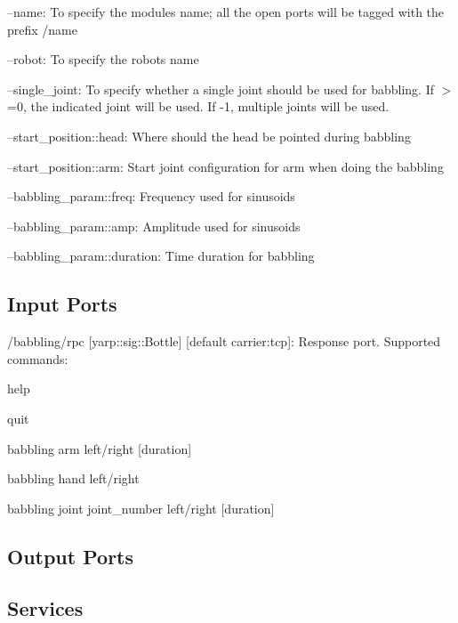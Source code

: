 \begin{DoxyItemize}
\item --name\+: To specify the module\textquotesingle{}s name; all the open ports will be tagged with the prefix /name
\item --robot\+: To specify the robot\textquotesingle{}s name
\item --single\+\_\+joint\+: To specify whether a single joint should be used for babbling. If $>$=0, the indicated joint will be used. If -\/1, multiple joints will be used.
\item --start\+\_\+position\+::head\+: Where should the head be pointed during babbling
\item --start\+\_\+position\+::arm\+: Start joint configuration for arm when doing the babbling
\item --babbling\+\_\+param\+::freq\+: Frequency used for sinusoids
\item --babbling\+\_\+param\+::amp\+: Amplitude used for sinusoids
\item --babbling\+\_\+param\+::duration\+: Time duration for babbling 
\end{DoxyItemize}\hypertarget{group__touchDetector_inputports_sec}{}\subsection{Input Ports}\label{group__touchDetector_inputports_sec}

\begin{DoxyItemize}
\item /babbling/rpc \mbox{[}yarp\+::sig\+::\+Bottle\mbox{]} \mbox{[}default carrier\+:tcp\mbox{]}\+: Response port. Supported commands\+:
\begin{DoxyItemize}
\item help
\item quit
\item babbling arm left/right \mbox{[}duration\mbox{]}
\item babbling hand left/right
\item babbling joint joint\+\_\+number left/right \mbox{[}duration\mbox{]}
\end{DoxyItemize}
\end{DoxyItemize}\hypertarget{group__touchDetector_outputports_sec}{}\subsection{Output Ports}\label{group__touchDetector_outputports_sec}
\hypertarget{group__touchDetector_services_sec}{}\subsection{Services}\label{group__touchDetector_services_sec}


